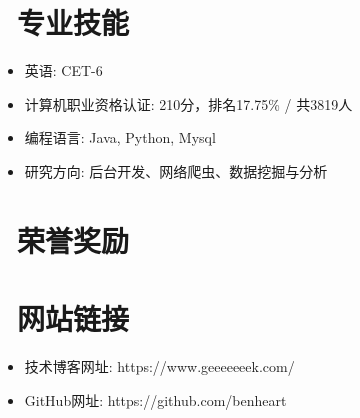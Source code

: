 \documentclass{resume}
\begin{document}
    \section{\faCogs\ 专业技能}
    \begin{itemize}[parsep=0.5ex]
        \item 英语: CET-6
        \item 计算机职业资格认证: 210分，排名17.75\% / 共3819人
        \item 编程语言: Java, Python, Mysql
        \item 研究方向: 后台开发、网络爬虫、数据挖掘与分析
    \end{itemize}

    \section{\faTrophy\ 荣誉奖励}

    \section{\faLink\ 网站链接}
    \begin{itemize}[parsep=0.5ex]
        \item 技术博客网址: https://www.geeeeeeek.com/
        \item GitHub网址: https://github.com/benheart
    \end{itemize}
\end{document}
